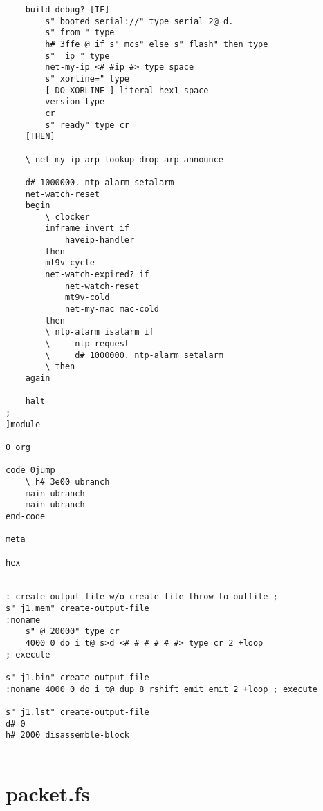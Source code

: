\begin{verbatim}
    build-debug? [IF]
        s" booted serial://" type serial 2@ d.
        s" from " type
        h# 3ffe @ if s" mcs" else s" flash" then type
        s"  ip " type
        net-my-ip <# #ip #> type space
        s" xorline=" type
        [ DO-XORLINE ] literal hex1 space
        version type
        cr
        s" ready" type cr
    [THEN]

    \ net-my-ip arp-lookup drop arp-announce

    d# 1000000. ntp-alarm setalarm
    net-watch-reset
    begin
        \ clocker
        inframe invert if
            haveip-handler
        then
        mt9v-cycle
        net-watch-expired? if
            net-watch-reset
            mt9v-cold
            net-my-mac mac-cold
        then
        \ ntp-alarm isalarm if
        \     ntp-request
        \     d# 1000000. ntp-alarm setalarm
        \ then
    again

    halt
;
]module

0 org

code 0jump
    \ h# 3e00 ubranch
    main ubranch
    main ubranch
end-code

meta

hex


: create-output-file w/o create-file throw to outfile ;
s" j1.mem" create-output-file
:noname
    s" @ 20000" type cr
    4000 0 do i t@ s>d <# # # # # #> type cr 2 +loop
; execute

s" j1.bin" create-output-file
:noname 4000 0 do i t@ dup 8 rshift emit emit 2 +loop ; execute

s" j1.lst" create-output-file
d# 0
h# 2000 disassemble-block
 
\end{verbatim}

\section{packet.fs}

